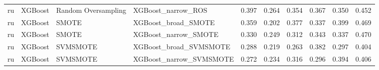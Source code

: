 \begin{tabular}{llllllllll}
      ru &                      XGBoost & Random Oversampling &                           XGBoost\_narrow\_ROS & 0.397 &                     0.264 &                 0.354 &                  0.367 &                                   0.350 &     0.452 \\
      ru &                      XGBoost &               SMOTE &                          XGBoost\_broad\_SMOTE & 0.359 &                     0.202 &                 0.377 &                  0.337 &                                   0.399 &     0.469 \\
      ru &                      XGBoost &               SMOTE &                         XGBoost\_narrow\_SMOTE & 0.330 &                     0.249 &                 0.312 &                  0.343 &                                   0.337 &     0.470 \\
      ru &                      XGBoost &            SVMSMOTE &                       XGBoost\_broad\_SVMSMOTE & 0.288 &                     0.219 &                 0.263 &                  0.382 &                                   0.297 &     0.404 \\
      ru &                      XGBoost &            SVMSMOTE &                      XGBoost\_narrow\_SVMSMOTE & 0.272 &                     0.234 &                 0.316 &                  0.296 &                                   0.394 &     0.406 \\
\bottomrule
\end{tabular}
